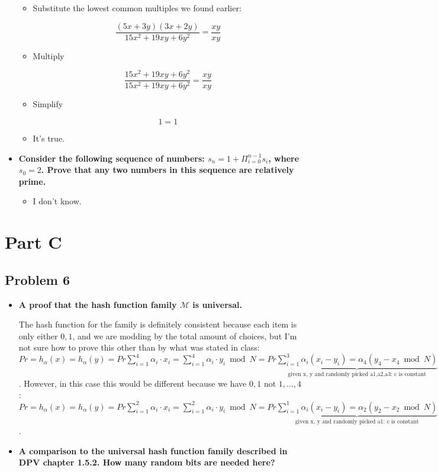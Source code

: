 \documentclass[11pt]{article}
\begin{document}
\begin{itemize}
\begin{itemize}
\item Substitute the lowest common multiples we found earlier:

$$ \frac{(5x+3y)(3x+2y)}{15x^2 + 19xy + 6y^2} = \frac{xy}{xy} $$

\item Multiply

$$ \frac{15x^2 + 19xy + 6y^2}{15x^2 + 19xy + 6y^2} = \frac{xy}{xy} $$

\item Simplify

$$ 1 = 1 $$

\item It's true.

\end{itemize}

\item \textbf{Consider the following sequence of numbers: $s_n = 1 +
  \Pi_{i=0}^{n-1} s_i$, where $s_0 = 2$. Prove that any two numbers in
  this sequence are relatively prime.}
  
  \begin{itemize}
  
  \item I don't know.
  
  \end{itemize}
  
\end{itemize}

\section*{Part C}

\subsection*{Problem 6}

\begin{itemize}

\item \textbf{A proof that the hash function family $\mathcal{M}$ is
  universal.}


The hash function for the family is definitely consistent because each item is only either $0,1$, and we are modding by the total amount of choices, but I'm not sure how to prove this other than by what was stated in class: $Pr = { h_\alpha(x) = h_\alpha(y)} = Pr { \sum_{i=1}^4 \alpha_i \cdot x_i = \sum_{i = 1}^4 \alpha_i \cdot y_i \bmod N} = Pr {\underbrace{\sum_{i=1}^3 \alpha_i (x_i - y_i) = \alpha_4 (y_4 - x_4 \bmod N)}_\text{given x, y and randomly picked a1,a2,a3: c is constant}}$. However, in this case this would be different because we have $0,1$ not $1,...,4$: $Pr = { h_\alpha(x) = h_\alpha(y)} = Pr { \sum_{i=1}^2 \alpha_i \cdot x_i = \sum_{i = 1}^2 \alpha_i \cdot y_i \bmod N} = Pr {\underbrace{\sum_{i=1}^1 \alpha_i (x_i - y_i) = \alpha_2 (y_2 - x_2 \bmod N)}_\text{given x, y and randomly picked a1: c is constant}}$.

\item \textbf{A comparison to the universal hash function family described in
  DPV chapter 1.5.2. How many random bits are needed here?}

\end{itemize}
\end{document}
